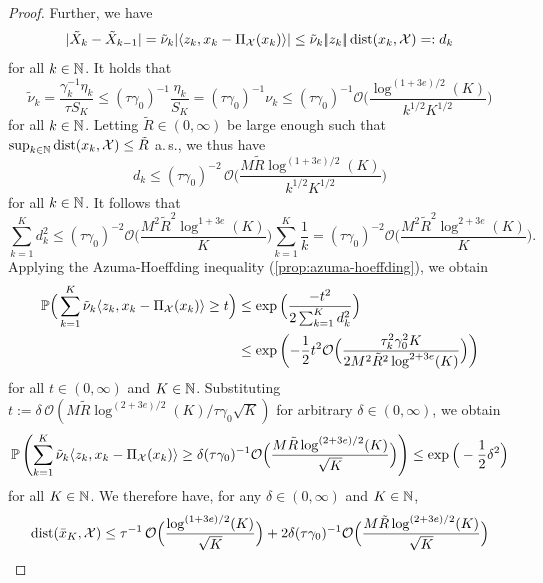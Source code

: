 \begin{proof}
    Further, we have
    \[
        |\tilde{X}_k - \tilde{X}_{k-1}|
        = \tilde{\nu}_k |\langle z_k, x_k - \operatorname{\Pi_\mathcal{X}}(x_k) \rangle|
        \leq \tilde{\nu}_k |\!|z_k|\!| \operatorname{dist}(x_k,\mathcal{X}) =: d_k
    \]
    for all $k\in\mathbb{N}$.
    It holds that
    \[
        \tilde{\nu}_k = \frac{\gamma_k^{-1}\eta_k}{\tau S_K}
        \leq (\tau\gamma_0)^{-1}\frac{\eta_k}{S_K}
        = (\tau\gamma_0)^{-1}\nu_k
        \leq (\tau\gamma_0)^{-1} \mathcal{O}\Big( \frac{\log^{(1 + 3e) / 2} (K)}{k^{1/2} K^{1/2}} \Big)
    \]
    for all $k\in\mathbb{N}$.
    Letting $\tilde{R}\in(0,\infty)$ be large enough such that
    $\sup_{k\in\mathbb{N}} \operatorname{dist}(x_k, \mathcal{X}) \leq \tilde{R}$ a.\,s., we thus have
    \[
        d_k \leq (\tau\gamma_0)^{-2} \, \mathcal{O}\Big( \frac{M \tilde{R} \log^{(1 + 3e) / 2} (K)}{k^{1/2} K^{1/2}} \Big)
    \]
    for all $k\in\mathbb{N}$.
    It follows that
    \[
        \sum_{k=1}^K d_k^2
        \leq
        (\tau\gamma_0)^{-2} \mathcal{O}\Big( \frac{M^2 \tilde{R}^2 \log^{1 + 3e} (K)}{K} \Big) \sum_{k=1}^K \frac{1}{k}
        =
        (\tau\gamma_0)^{-2} \mathcal{O}\Big( \frac{M^2 \tilde{R}^2 \log^{2 + 3e} (K)}{K} \Big).
    \]
    Applying the Azuma-Hoeffding inequality (\cref{prop:azuma-hoeffding}),
    we obtain
    \begin{align*}
        \mathbb{P}\Big( \sum_{k=1}^K \tilde{\nu}_k \langle z_k, x_k - \operatorname{\Pi_\mathcal{X}}(x_k) \rangle \geq t \Big)
        &\leq
        \exp\Big( \frac{-t^2}{2\sum_{k=1}^K d_k^2} \Big) \\
        &\leq
        \exp\left(-\frac{1}{2}t^2 \mathcal{O}\Big(\frac{\tau_k^2 \gamma_0^2 K}{2 M^2 \tilde{R}^2 \log^{2 + 3e}(K)}\Big) \right)
    \end{align*}
    for all $t\in(0, \infty)$ and $K\in\mathbb{N}$. Substituting
    $t := \delta \, \mathcal{O}(M\tilde{R} \log^{(2 + 3e) / 2}(K) / \tau\gamma_0\sqrt{K})$ for arbitrary $\delta\in(0, \infty)$,
    we obtain
    \[
        \mathbb{P}\left( \sum_{k=1}^K \tilde{\nu}_k \langle z_k, x_k - \operatorname{\Pi_\mathcal{X}}(x_k) \rangle
                \geq \delta (\tau\gamma_0)^{-1} \mathcal{O}\Big( \frac{M\tilde{R} \log^{(2 + 3e) / 2}(K)}{\sqrt{K}} \Big) \right)
        \leq
        \exp\Big( -\frac{1}{2}\delta^2 \Big)
    \]
    for all $K\in\mathbb{N}$. We therefore have, for any $\delta\in(0,\infty)$ and $K\in\mathbb{N}$,
    \begin{align}
        \label{eq:proof:thm:convergence-with-high-probability-convex-case}
        \dist(\bar{x}_K, \mathcal{X})
        &\leq \tau^{-1} \, \mathcal{O}\Big( \frac{\log^{(1 + 3e) / 2}(K)}{\sqrt{K}} \Big) + 2\delta (\tau\gamma_0)^{-1}
        \mathcal{O}\Big( \frac{M\tilde{R} \log^{(2 + 3e) / 2}(K)}{\sqrt{K}} \Big) \notag \\

\end{align}
\end{proof}
